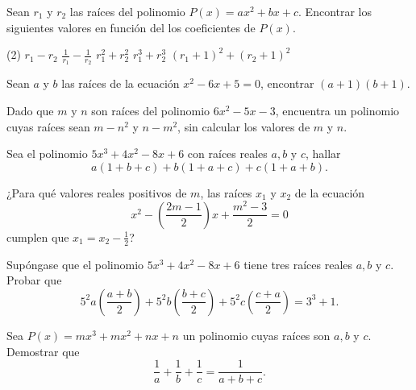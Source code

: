 \showLine
\begin{multicols}{2}

    \begin{exercise}
        Sean $r_1$ y $r_2$ las raíces del polinomio $P(x) = ax^2 + bx + c$.
        Encontrar los siguientes valores en función del los coeficientes de $P(x)$.
        \begin{tasks}(2)
            \task $r_1 - r_2$
            \task $\frac{1}{r_1} - \frac{1}{r_2}$
            \task $r^2_1 + r^2_2$
            \task $r^3_1 + r^3_2$
            \task $(r_1 + 1)^2 + (r_2 + 1)^2$
        \end{tasks}
    \end{exercise}

    \begin{exercise}
        Sean $a$ y $b$ las raíces de la ecuación $x^2 - 6x + 5 = 0$, encontrar $(a + 1)(b + 1)$.
    \end{exercise}

    \begin{exercise}
        Dado que $m$ y $n$ son raíces del polinomio $6x^2 - 5x - 3$, encuentra un polinomio cuyas raíces sean
        $m - n^2$ y $n - m^2$, sin calcular los valores de $m$ y $n$.
    \end{exercise}

    \begin{exercise}
        Sea el polinomio $5x^3 + 4x^2 - 8x + 6$ con raíces reales $a, b$ y $c$, hallar
        \[
            a(1 + b + c) + b(1 + a + c) + c(1 + a + b).
        \]
    \end{exercise}

    \begin{exercise}
        ¿Para qué valores reales positivos de $m$, las raíces $x_1$ y $x_2$ de la ecuación
        \[
            x^2 - \left( \frac{2m - 1}{2} \right)x  + \frac{m^2 - 3}{2} = 0
        \]
        cumplen que $x_1 = x_2 - \frac{1}{2}$?
    \end{exercise}

    \begin{exercise}
        Supóngase que el polinomio $5x^3 + 4x^2 - 8x + 6$ tiene tres raíces reales $a, b$ y $c$.
        Probar que
        \[
            5^2 a \left(\frac{a + b}{2}\right) + 5^2 b \left(\frac{b + c}{2}\right) + 5^2 c \left(\frac{c + a}{2}\right) = 3^3 + 1.
        \]
    \end{exercise}

    \begin{problem}
        Sea $P(x) = mx^3 + mx^2 + nx + n$ un polinomio cuyas raíces son $a, b$ y $c$.
        Demostrar que
        \[
            \frac{1}{a} + \frac{1}{b} + \frac{1}{c} = \frac{1}{a + b + c}.
        \]
    \end{problem}


\end{multicols}
